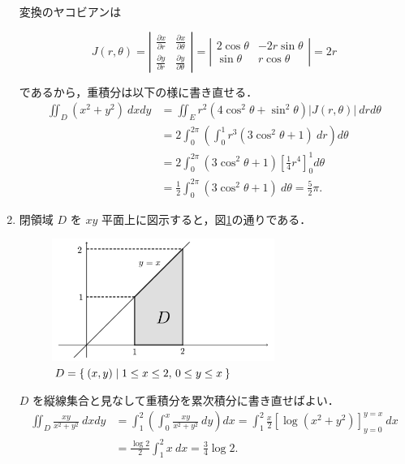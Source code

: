 \documentclass[11pt, uplatex, dvipdfmx]{jsarticle}
\begin{document}
\begin{enumerate}[(1)]
     変換のヤコビアンは
     \begin{spacing}{1.3}
       \[
         J(r,\theta) = \left|
           \begin{array}{cc}
             \frac{\partial x}{\partial r} & \frac{\partial x}{\partial \theta}\\
             \frac{\partial y}{\partial r} & \frac{\partial y}{\partial \theta}
           \end{array}
         \right| = \left|
           \begin{array}{rr}
             2 \cos \theta & -2 r \sin \theta\\
             \sin \theta & r \cos \theta
           \end{array}
         \right| = 2r
       \]
     \end{spacing}
     であるから，重積分は以下の様に書き直せる．
       \begin{align*}
         \iint_D (x^2+y^2) \ dx dy &= \iint_E r^2(4\cos^2 \theta + \sin^2 \theta) |J(r,\theta)| \ dr d\theta\\
         &= 2 \int_{0}^{2\pi} \left( \int_{0}^{1} r^3 (3 \cos^2 \theta +1) \ dr \right) d\theta\\
         &= 2 \int_{0}^{2\pi} (3 \cos^2 \theta+1) \left[\frac{1}{4}r^4\right]_{0}^{1} d\theta\\
         &= \frac{1}{2} \int_{0}^{2\pi} (3\cos^2 \theta +1) \ d\theta = \frac{5}{2}\pi.
       \end{align*}

   \item 閉領域 $D$ を $xy$ 平面上に図示すると，図\ref{fig:no11}の通りである．
     \begin{figure}[h]
       \centering
       \includegraphics[height=4cm]{./pictures/no11.pdf}
       \caption{$D=\Set{ (x,y)  |  1 \leq x \leq 2, \, 0 \leq y \leq x }$}\label{fig:no11}        
     \end{figure}

     $D$ を縦線集合と見なして重積分を累次積分に書き直せばよい．
     \begin{align*}
       \iint_D \frac{xy}{x^2+y^2} \ dx dy 
       &= \int_{1}^{2} \left( \int_{0}^{x} \frac{xy}{x^2+y^2} \ dy \right) dx
         = \int_{1}^{2} \frac{x}{2}\left[\log(x^2+y^2)\right]_{y=0}^{y=x} \ dx\\
       &= \frac{\log 2}{2} \int_{1}^{2}  x \ dx = \frac{3}{4} \log 2.
     \end{align*}
     

\end{enumerate}
\end{document}
